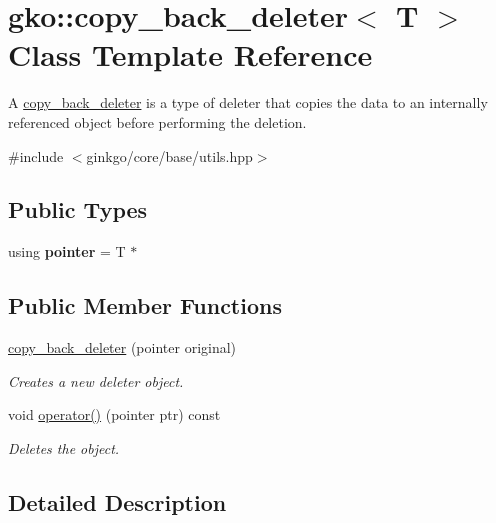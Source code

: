 \hypertarget{classgko_1_1copy__back__deleter}{}\section{gko\+:\+:copy\+\_\+back\+\_\+deleter$<$ T $>$ Class Template Reference}
\label{classgko_1_1copy__back__deleter}


A \hyperlink{classgko_1_1copy__back__deleter}{copy\+\_\+back\+\_\+deleter} is a type of deleter that copies the data to an internally referenced object before performing the deletion.  




{\ttfamily \#include $<$ginkgo/core/base/utils.\+hpp$>$}

\subsection*{Public Types}
\begin{DoxyCompactItemize}
\item 
\mbox{\label{classgko_1_1copy__back__deleter_a55bb1515ad3849a704abb253a8cbb061}} 
using {\bfseries pointer} = T $\ast$
\end{DoxyCompactItemize}
\subsection*{Public Member Functions}
\begin{DoxyCompactItemize}
\item 
\hyperlink{classgko_1_1copy__back__deleter_affa618330dcb3a4e3aeaffb69c39df5f}{copy\+\_\+back\+\_\+deleter} (pointer original)
\begin{DoxyCompactList}\small\item\em Creates a new deleter object. \end{DoxyCompactList}\item 
void \hyperlink{classgko_1_1copy__back__deleter_a34bba76c78c23dccd814969e98c78b1b}{operator()} (pointer ptr) const
\begin{DoxyCompactList}\small\item\em Deletes the object. \end{DoxyCompactList}\end{DoxyCompactItemize}


\subsection{Detailed Description}
